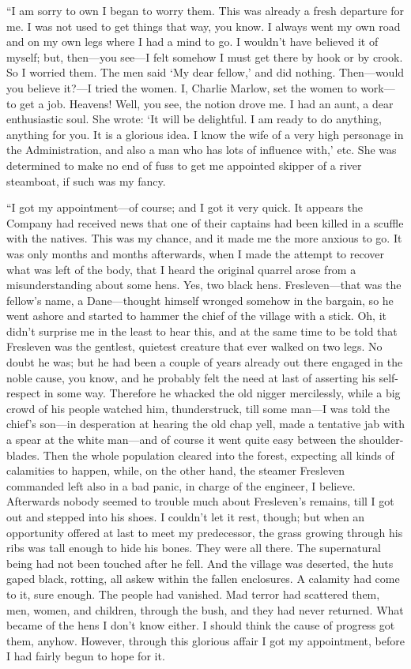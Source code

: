 \documentclass[12pt]{report}
\begin{document}
``I am sorry to own I began to worry them. This was already a fresh
departure for me. I was not used to get things that way, you know. I
always went my own road and on my own legs where I had a mind to go. I
wouldn't have believed it of myself; but, then---you see---I felt
somehow I must get there by hook or by crook. So I worried them. The men
said `My dear fellow,' and did nothing. Then---would you believe it?---I
tried the women. I, Charlie Marlow, set the women to work---to get a
job. Heavens! Well, you see, the notion drove me. I had an aunt, a dear
enthusiastic soul. She wrote: `It will be delightful. I am ready to do
anything, anything for you. It is a glorious idea. I know the wife of a
very high personage in the Administration, and also a man who has lots
of influence with,' etc. She was determined to make no end of fuss to
get me appointed skipper of a river steamboat, if such was my fancy.

``I got my appointment---of course; and I got it very quick. It appears
the Company had received news that one of their captains had been killed
in a scuffle with the natives. This was my chance, and it made me the
more anxious to go. It was only months and months afterwards, when I
made the attempt to recover what was left of the body, that I heard the
original quarrel arose from a misunderstanding about some hens. Yes, two
black hens. Fresleven---that was the fellow's name, a Dane---thought
himself wronged somehow in the bargain, so he went ashore and started to
hammer the chief of the village with a stick. Oh, it didn't surprise me
in the least to hear this, and at the same time to be told that
Fresleven was the gentlest, quietest creature that ever walked on two
legs. No doubt he was; but he had been a couple of years already out
there engaged in the noble cause, you know, and he probably felt the
need at last of asserting his self-respect in some way. Therefore he
whacked the old nigger mercilessly, while a big crowd of his people
watched him, thunderstruck, till some man---I was told the chief's
son---in desperation at hearing the old chap yell, made a tentative jab
with a spear at the white man---and of course it went quite easy between
the shoulder-blades. Then the whole population cleared into the forest,
expecting all kinds of calamities to happen, while, on the other hand,
the steamer Fresleven commanded left also in a bad panic, in charge of
the engineer, I believe. Afterwards nobody seemed to trouble much about
Fresleven's remains, till I got out and stepped into his shoes. I
couldn't let it rest, though; but when an opportunity offered at last to
meet my predecessor, the grass growing through his ribs was tall enough
to hide his bones. They were all there. The supernatural being had not
been touched after he fell. And the village was deserted, the huts gaped
black, rotting, all askew within the fallen enclosures. A calamity had
come to it, sure enough. The people had vanished. Mad terror had
scattered them, men, women, and children, through the bush, and they had
never returned. What became of the hens I don't know either. I should
think the cause of progress got them, anyhow. However, through this
glorious affair I got my appointment, before I had fairly begun to hope
for it.
\end{document}
